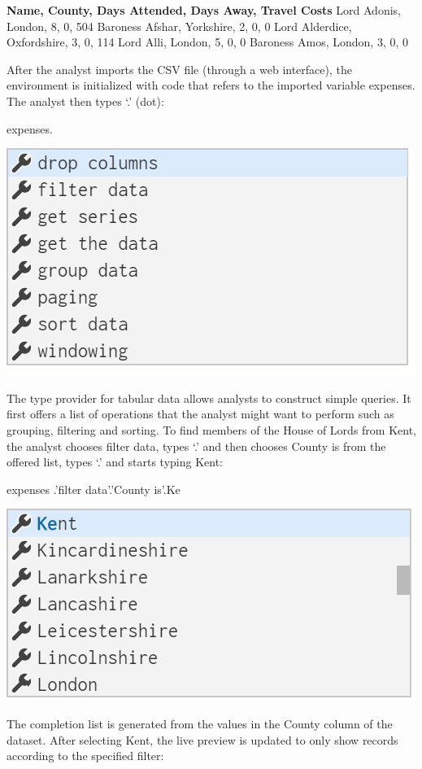 \documentclass{sigchi}
\newcommand{\ikvd}[1]{{\fontfamily{zi4}\selectfont\small #1}}
\begin{document}
\begin{thegamma}
\textbf{Name, County, Days Attended, Days Away, Travel Costs}
Lord Adonis, London, 8, 0, 504
Baroness Afshar, Yorkshire, 2, 0, 0
Lord Alderdice, Oxfordshire, 3, 0, 114
Lord Alli, London, 5, 0, 0
Baroness Amos, London, 3, 0, 0
\end{thegamma}

After the analyst imports the CSV file (through a web interface), the environment is initialized
with code that refers to the imported variable \ikvd{expenses}. The analyst then types `.' (dot):

\begin{thegamma}
expenses.
\end{thegamma}
\vspace{-0.4em}\qquad\includegraphics[width=0.5\columnwidth]{figures/lords1}

The type provider for tabular data allows analysts to construct simple queries. It first offers
a list of operations that the analyst might want to perform such as grouping, filtering and sorting.
To find members of the House of Lords from Kent, the analyst chooses \ikvd{filter data},
types `.' and then chooses \ikvd{County is} from the offered list, types `.' and starts
typing Kent:

\begin{thegamma}
expenses
  .'filter data'.'County is'.Ke
\end{thegamma}
\vspace{-0.4em}\qquad\includegraphics[width=0.5\columnwidth]{figures/lords2}

The completion list is generated from the values in the \ikvd{County} column of the dataset.
After selecting \ikvd{Kent}, the live preview is updated to only show records according to the
specified filter:
\end{document}
